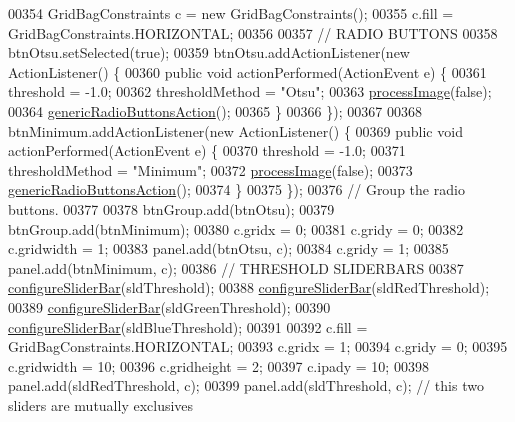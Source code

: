 \begin{DoxyCode}
{00354     GridBagConstraints c = \textcolor{keyword}{new} GridBagConstraints();
00355     c.fill = GridBagConstraints.HORIZONTAL;
00356 
00357     \textcolor{comment}{// RADIO BUTTONS}
00358     btnOtsu.setSelected(\textcolor{keyword}{true});
00359     btnOtsu.addActionListener(\textcolor{keyword}{new} ActionListener() \{
00360       \textcolor{keyword}{public} \textcolor{keywordtype}{void} actionPerformed(ActionEvent e) \{
00361         threshold = -1.0;
00362         thresholdMethod = \textcolor{stringliteral}{"Otsu"};
00363         \hyperlink{classgui_1_1_image_analysis_window_a92de44ef00adbefce701ecb95b7d926b}{processImage}(\textcolor{keyword}{false});
00364         \hyperlink{classgui_1_1_image_analysis_window_ac6d8295d31ef4fe8406770e84eb35bf6}{genericRadioButtonsAction}();
00365       \}
00366     \});
00367     
00368     btnMinimum.addActionListener(\textcolor{keyword}{new} ActionListener() \{
00369       \textcolor{keyword}{public} \textcolor{keywordtype}{void} actionPerformed(ActionEvent e) \{
00370         threshold = -1.0;
00371         thresholdMethod = \textcolor{stringliteral}{"Minimum"};
00372         \hyperlink{classgui_1_1_image_analysis_window_a92de44ef00adbefce701ecb95b7d926b}{processImage}(\textcolor{keyword}{false});   
00373         \hyperlink{classgui_1_1_image_analysis_window_ac6d8295d31ef4fe8406770e84eb35bf6}{genericRadioButtonsAction}();
00374       \}
00375     \});
00376     \textcolor{comment}{// Group the radio buttons.}
00377    
00378     btnGroup.add(btnOtsu);
00379     btnGroup.add(btnMinimum);
00380     c.gridx = 0;
00381     c.gridy = 0;
00382     c.gridwidth = 1;
00383     panel.add(btnOtsu, c);
00384     c.gridy = 1;
00385     panel.add(btnMinimum, c);
00386     \textcolor{comment}{// THRESHOLD SLIDERBARS}
00387     \hyperlink{classgui_1_1_image_analysis_window_a59aed828ede257a7487f529a114dbf3d}{configureSliderBar}(sldThreshold);
00388     \hyperlink{classgui_1_1_image_analysis_window_a59aed828ede257a7487f529a114dbf3d}{configureSliderBar}(sldRedThreshold);
00389     \hyperlink{classgui_1_1_image_analysis_window_a59aed828ede257a7487f529a114dbf3d}{configureSliderBar}(sldGreenThreshold);
00390     \hyperlink{classgui_1_1_image_analysis_window_a59aed828ede257a7487f529a114dbf3d}{configureSliderBar}(sldBlueThreshold);
00391     
00392     c.fill = GridBagConstraints.HORIZONTAL;
00393     c.gridx = 1;
00394     c.gridy = 0;
00395     c.gridwidth = 10;
00396     c.gridheight = 2;
00397     c.ipady = 10;
00398     panel.add(sldRedThreshold, c);
00399     panel.add(sldThreshold, c); \textcolor{comment}{// this two sliders are mutually exclusives}
}
\end{DoxyCode}

